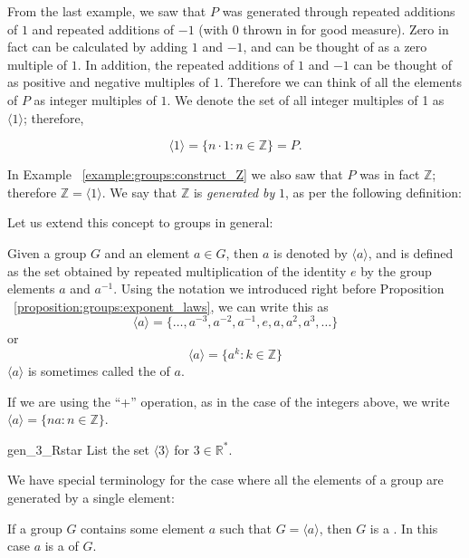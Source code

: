\noindent
From the last example, we saw that $P$ was generated through repeated additions of $1$ and  repeated additions of $-1$ (with $0$ thrown in for good measure).  
Zero in fact can be calculated by adding $1$ and $-1$, and can be thought of as a zero multiple of $1$.  In addition,  the repeated additions of $1$ and $-1$ can be thought of 
as positive and negative multiples of $1$.  Therefore we can think of all the elements of $P$ as integer multiples of $1$.  We denote the set of all integer multiples of 1 as $\langle 1 \rangle$; therefore, 

\[ \langle 1 \rangle = \{ n \cdot 1 : n \in \mathbb Z \} = P. \]

\noindent
In Example ~\ref{example:groups:construct_Z} we also saw that $P$ was in fact $\mathbb Z$; therefore $\mathbb Z = \langle 1 \rangle$. We say that $\mathbb Z$ is \emph{generated by} $1$, as per the following definition:

Let us extend this concept to groups in general:

\begin{defn}\label{defn_set_gen} Given a group $G$ and an element $a \in G$, then  $a$ is denoted by $\langle a \rangle$, and is defined as the set obtained by repeated multiplication of the identity $e$ by the group elements $a$ and $a^{-1}$.  Using the notation we introduced right before Proposition ~\ref{proposition:groups:exponent_laws}, we can write this as
\[ \langle a \rangle = \{ \ldots, a^{-3}, a^{-2}, a^{-1}, e, a, a^2, a^3, \ldots \} \]
\noindent
or
\[ \langle a \rangle = \{ a^{k} : k \in \mathbb Z \} \]
$\langle a \rangle$ is sometimes called the  of $a$.
\end{defn}
\begin{rem}\label{rem_orbits}
If we are using the ``+'' operation, as in the case of the integers above, we write $\langle a \rangle  = \{ na : n \in {\mathbb Z} \}$.
\end{rem}

\begin{exercise}{gen_3_Rstar}
List the set $\langle 3 \rangle$ for $3 \in {\mathbb R}^*$.
\end{exercise}

\noindent
We have special terminology for the case where all the elements of a group are generated by a single element:

\begin{defn}\label{cyclic_generator}
 If a group $G$ contains some element $a$ such that $G = \langle a \rangle $, then $G$ is a
. In this case $a$ is a  of $G$.
\end{defn}

